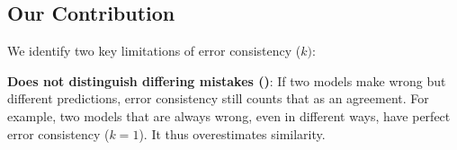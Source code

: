 \begin{table*}[htbp]
  \centering
  \caption{%
  \textbf{Comparison of Functional Model Similarity Metrics}. Only our metric, CAPA, satisfies all three desiderata:\\ 
    \ \textit{Adjusts for accuracy} -- The metric should not inflate scores for high accuracy model pairs due to lesser scope to disagree. \newline
    \ \textit{Distinguishes different mistakes} -- The metric should consider different wrong predictions as a disagreement. \newline
    \ \textit{Incorporates probabilities} -- The metric should use the probability distribution over predictions provided by the models.
  }
  \label{tab:metric_comparison}
\end{table*}

\subsection{Our Contribution}
\label{sec:metric_ours}

We identify two key limitations of error consistency ($k)$:

\textbf{Does not distinguish differing mistakes ()}: If two models make wrong but different predictions, error consistency still counts that as an agreement. For example, two models that are always wrong, even in different ways, have perfect error consistency ($k=1$). It thus overestimates similarity.


